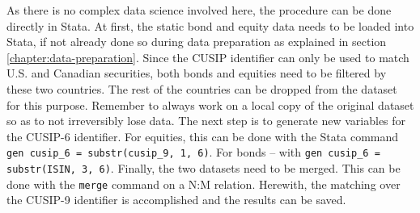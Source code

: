 As there is no complex data science involved here, the procedure can be done directly in Stata. At first, the static bond and equity data needs to be loaded into Stata, if not already done so during data preparation as explained in section \ref{chapter:data-preparation}. Since the CUSIP identifier can only be used to match U.S. and Canadian securities, both bonds and equities need to be filtered by these two countries. The rest of the countries can be dropped from the dataset for this purpose. Remember to always work on a local copy of the original dataset so as to not irreversibly lose data. The next step is to generate new variables for the CUSIP-6 identifier. For equities, this can be done with the Stata command \lstinline|gen cusip_6 = substr(cusip_9, 1, 6)|. For bonds -- with \lstinline|gen cusip_6 = substr(ISIN, 3, 6)|. Finally, the two datasets need to be merged. This can be done with the \lstinline|merge| command on a N:M relation. 
Herewith, the matching over the CUSIP-9 identifier is accomplished and the results can be saved. 


